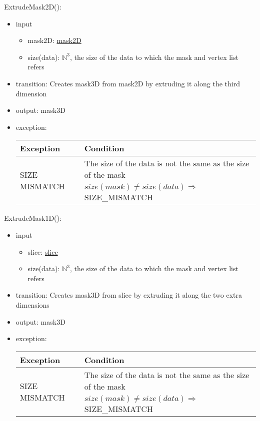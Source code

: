 \documentclass[12pt, titlepage]{article}
\begin{document}
\noindent ExtrudeMask2D():
\begin{itemize}
    \item input
    \begin{itemize}
        \item mask2D: \hyperref[Mod:Mask2D]{mask2D}
        \item size(data): $\mathbb{N}^3$, the size of the data to which the mask
        and vertex list refers
    \end{itemize}
    \item transition: Creates mask3D from mask2D by extruding it along the third
    dimension
    \item output: mask3D
    \item exception:
    \begin{center}
        \begin{tabular}{p{3.5cm} p{12cm}}
            \toprule[0.15em]
            \textbf{Exception} & \textbf{Condition}\\
            \midrule[0.1em]
            \multirow{2}{0.25\textwidth}{SIZE MISMATCH} & The size of the data
            is not the same as the size of the mask\\ 
            & $size(mask) \neq size(data) \Rightarrow$ SIZE\_MISMATCH\\ 
            \bottomrule[0.15em]
        \end{tabular}
    \end{center}
\end{itemize}

\noindent ExtrudeMask1D():
\begin{itemize}
    \item input
    \begin{itemize}
        \item slice: \hyperref[Mod:Slice1D]{slice}
        \item size(data): $\mathbb{N}^3$, the size of the data to which the mask
        and vertex list refers
    \end{itemize}
    \item transition: Creates mask3D from slice by extruding it along the two
    extra dimensions
    \item output: mask3D
    \item exception:
    \begin{center}
        \begin{tabular}{p{3.5cm} p{12cm}}
            \toprule[0.15em]
            \textbf{Exception} & \textbf{Condition}\\
            \midrule[0.1em]
            \multirow{2}{0.25\textwidth}{SIZE MISMATCH} & The size of the data
            is not the same as the size of the mask\\ 
            & $size(mask) \neq size(data) \Rightarrow$ SIZE\_MISMATCH\\ 
            \bottomrule[0.15em]
        \end{tabular}
    \end{center}
\end{itemize}
\end{document}
